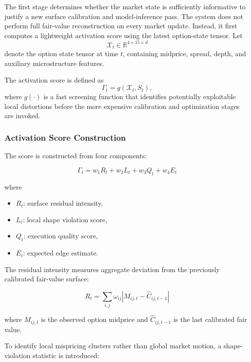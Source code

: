 \documentclass[11pt, a4paper]{article}
\begin{document}
The first stage determines whether the market state is sufficiently informative to justify a new surface calibration and model-inference pass. The system does not perform full fair-value reconstruction on every market update. Instead, it first computes a lightweight activation score using the latest option-state tensor. Let
\[
\mathcal{X}_t
\in
\mathbb{R}^{4\times 15 \times d}
\]
denote the option state tensor at time \(t\), containing midprice, spread, depth, and auxiliary microstructure features.

The activation score is defined as
\[
\Gamma_t
=
g(\mathcal{X}_t,S_t),
\]
where $g(\cdot)$ is a fast screening function that identifies potentially exploitable local distortions before the more expensive calibration and optimization stages are invoked.

\subsubsection{Activation Score Construction}

The score is constructed from four components:

\begin{equation}
\Gamma_t
=
w_1 R_t
+
w_2 L_t
+
w_3 Q_t
+
w_4 E_t
\end{equation}

where

\begin{itemize}
    \item \(R_t\): surface residual intensity,
    \item \(L_t\): local shape violation score,
    \item \(Q_t\): execution quality score,
    \item \(E_t\): expected edge estimate.
\end{itemize}

The residual intensity measures aggregate deviation from the previously calibrated fair-value surface:

\begin{equation}
R_t
=
\sum_{i,j}
\omega_{ij}
\left|
M_{ij,t}
-
\widehat{C}_{ij,t-1}
\right|
\end{equation}

where \(M_{ij,t}\) is the observed option midprice and
\(\widehat{C}_{ij,t-1}\) is the last calibrated fair value.

To identify local mispricing clusters rather than global market motion, a shape-violation statistic is introduced:
\end{document}
